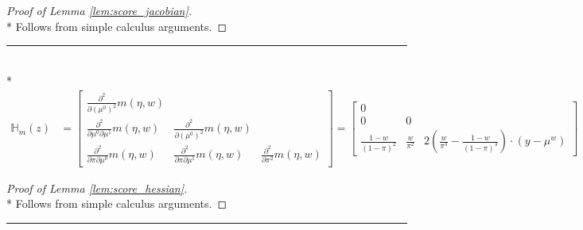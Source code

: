 \begin{proof}[Proof of Lemma \ref{lem:score_jacobian}]\mbox{}\\*
    Follows from simple calculus arguments.
\end{proof}

\hrule

\begin{lem}\label{lem:score_hessian}\mbox{}\\*
    \begin{equation}
        \begin{aligned}
            \mathbb{H}_{m}(z)
            & = \begin{bmatrix}
                \frac{\partial^2}{\partial \left(\mu^{0}\right)^2} m\left(\eta, w\right)   & & \\
                \frac{\partial^2}{\partial \mu^{0} \partial \mu^{1}} m\left(\eta, w\right) & \frac{\partial^2}{\partial \left(\mu^{0}\right)^2} m\left(\eta, w\right) & \\
                \frac{\partial^2}{\partial \pi \partial \mu^{0}} m\left(\eta, w\right)     & \frac{\partial^2}{\partial \pi \partial \mu^{1}} m\left(\eta, w\right) & \frac{\partial^2}{\partial \pi^2} m\left(\eta, w\right)
            \end{bmatrix} 
            = \begin{bmatrix}
                0  & & \\
                0 & 0 & \\
                \frac{1-w}{\left(1-\pi\right)^{2}} & \frac{w}{\pi^2} & 2\left(\frac{w}{\pi^3} - \frac{1-w}{\left(1-\pi\right)^{3}}\right)  \cdot \left(y - \mu^{w}\right)
            \end{bmatrix}
        \end{aligned}
    \end{equation}
\end{lem}

\begin{proof}[Proof of Lemma \ref{lem:score_hessian}]\mbox{}\\*
    Follows from simple calculus arguments.
\end{proof}

\hrule